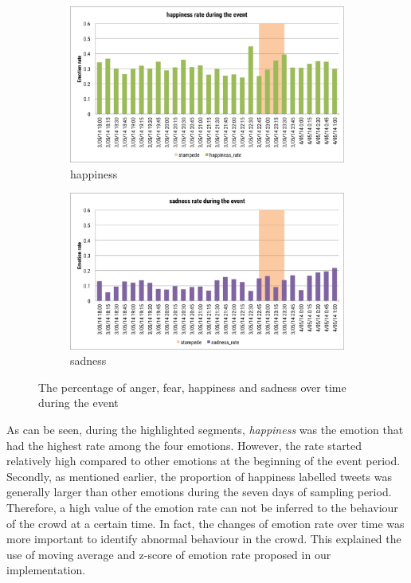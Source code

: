 \begin{figure}[hb!]
\begin{subfigure}{0.5\textwidth} 
\centering    
\includegraphics[width=0.99\linewidth]{HappinessRateEvent}
\caption{happiness}
\label{fig:happinessRateEvent}
\end{subfigure}%
\begin{subfigure}{0.5\textwidth}
\centering    
\includegraphics[width=0.99\linewidth]{SadnessRateEvent}
\caption{sadness}
\label{fig:sadnessRateEvent}
\end{subfigure}
\caption{The percentage of anger, fear, happiness and sadness over time during the event}
\label{fig:rateEvent}
\end{figure}

As can be seen, during the highlighted segments, \textit{happiness} was the emotion that had the highest rate among the four emotions. However, the rate started relatively high compared to other emotions at the beginning of the event period. Secondly, as mentioned earlier, the proportion of happiness labelled tweets was generally larger than other emotions during the seven days of sampling period. Therefore, a high value of the emotion rate can not be inferred to the behaviour of the crowd at a certain time. In fact, the changes of emotion rate over time was more important to identify abnormal behaviour in the crowd. This explained the use of moving average and z-score of emotion rate proposed in our implementation.

